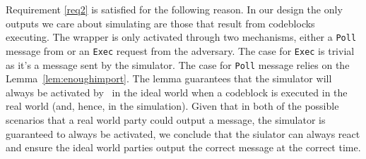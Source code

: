 Requirement \ref{req2} is satisfied for the following reason.
In our design the only outputs we care about simulating are those that result from codeblocks executing.
The wrapper is only activated through two mechanisms, either a \texttt{Poll} message from \Environment or an \texttt{Exec} request from the adversary.
The case for \texttt{Exec} is trivial as it's a message sent by the simulator.
The case for \texttt{Poll} message relies on the Lemma~\ref{lem:enoughimport}.
The lemma guarantees that the simulator will always be activated by \Wasync~in the ideal world when a codeblock is executed in the real world (and, hence, in the simulation).
Given that in both of the possible scenarios that a real world party could output a message, the simulator is guaranteed to always be activated, we conclude that the siulator can always react and ensure the ideal world parties output the correct message at the correct time.

